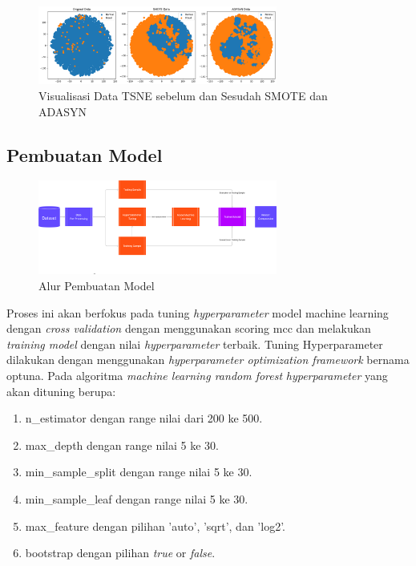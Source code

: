 \begin{figure}[H]
	\centering
	\includegraphics[width=0.7\textwidth]{figure/plot tsne.png}
	\caption{Visualisasi Data TSNE sebelum dan Sesudah SMOTE dan ADASYN}
	\label{fig:3.Visualisasi Data TSNE sebelum dan Sesudah SMOTE dan ADASYN}
\end{figure}

\subsection{Pembuatan Model}
\begin{figure}[H]
	\centering
	\includegraphics[width=0.7\textwidth]{figure/AlurPembuatanModel.png}
	\caption{Alur Pembuatan Model}
	\label{fig:3.alur pembuatan model}
\end{figure}
Proses ini akan berfokus pada tuning \textit{hyperparameter} model machine learning dengan \textit{cross validation} dengan menggunakan scoring mcc dan melakukan \textit{training model} dengan nilai \textit{hyperparameter} terbaik. Tuning Hyperparameter dilakukan dengan menggunakan \textit{hyperparameter optimization framework} bernama optuna. Pada algoritma \textit{machine learning random forest} \textit{hyperparameter} yang akan dituning berupa\cite{albahli2024efficient}:
\begin{enumerate}[noitemsep]
    \item n\_estimator dengan range nilai dari 200 ke 500.
    \item max\_depth dengan range nilai 5 ke 30.
    \item min\_sample\_split dengan range nilai 5 ke 30.
    \item min\_sample\_leaf dengan range nilai 5 ke 30.
    \item max\_feature dengan pilihan 'auto', 'sqrt', dan 'log2'.
    \item bootstrap dengan pilihan \textit{true} or \textit{false}.
\end{enumerate}
